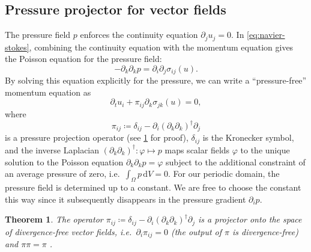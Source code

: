 \documentclass[preprint,twocolumn,5p]{elsarticle}
\newtheorem{theorem}{Theorem}
\begin{document}
\subsection{Pressure projector for vector fields}

The pressure field $p$ enforces the continuity equation $\partial_j u_j = 0$.
In \cref{eq:navier-stokes},
combining the continuity equation with the momentum equation gives
the Poisson equation for the pressure field:
\begin{equation} \label{eq:ns-poisson}
    -\partial_k \partial_k p = \partial_i \partial_j \sigma_{i j}(u).
\end{equation}
By solving this equation explicitly for the pressure, we can write a 
``pressure-free'' momentum equation as
\begin{equation} \label{eq:ns-pi}
    \partial_t u_i + \pi_{i j} \partial_k \sigma_{j k}(u) = 0,
\end{equation}
where
\begin{equation}
    \pi_{i j} \coloneq \delta_{i j} - \partial_{i} (\partial_k \partial_k)^{\dagger} \partial_j
\end{equation}
is a pressure projection operator (see \cref{th:vector-projector} for proof),
$\delta_{i j}$ is the Kronecker symbol,
and the inverse Laplacian $(\partial_k \partial_k)^{\dagger} : \varphi \mapsto p$
maps scalar fields $\varphi$ to the unique solution to the
Poisson equation $\partial_k \partial_k p = \varphi$
subject to the additional constraint of an average pressure of zero,
i.e.\ $\int_\Omega p \, \mathrm{d} V = 0$.
For our periodic domain, the pressure field is determined up to a constant.
We are free to choose the constant this way since it subsequently disappears in the
pressure gradient $\partial_i p$.

\begin{theorem} \label{th:vector-projector}
    The operator
    $\pi_{i j} \coloneq \delta_{i j} - \partial_i (\partial_k \partial_k)^{\dagger} \partial_j$
    is a projector onto the space of divergence-free vector fields,
    i.e.\ $\partial_i \pi_{i j} = 0$ (the output of $\pi$ is divergence-free)
    and $\pi \pi = \pi$
    \cite{chorinNumericalSolutionNavierStokes1968,
    temamLapproximationSolutionEquations1969,
    vremanProjectionMethodIncompressible2014}.
\end{theorem}
\end{document}
